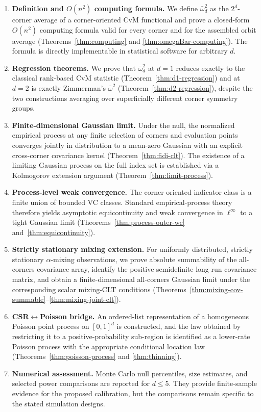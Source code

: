 \documentclass[pdflatex]{sn-jnl}
\theoremstyle{thmstyleone}
\theoremstyle{thmstyletwo}
\theoremstyle{thmstylethree}
\begin{document}
\begin{enumerate}
\item \textbf{Definition and $O(n^2)$ computing formula.} We define $\bar\omega^2_d$ as the $2^d$-corner average of a corner-oriented CvM functional and prove a closed-form $O(n^2)$ computing formula valid for every corner and for the assembled orbit average (Theorems~\ref{thm:computing} and \ref{thm:omegaBar-computing}). The formula is directly implementable in statistical software for arbitrary $d$.
\item \textbf{Regression theorems.} We prove that $\bar\omega^2_d$ at $d=1$ reduces exactly to the classical rank-based CvM statistic (Theorem~\ref{thm:d1-regression}) and at $d=2$ is exactly Zimmerman's $\bar\omega^2$ (Theorem~\ref{thm:d2-regression}), despite the two constructions averaging over superficially different corner symmetry groups.
\item \textbf{Finite-dimensional Gaussian limit.} Under the null, the normalized empirical process at any finite selection of corners and evaluation points converges jointly in distribution to a mean-zero Gaussian with an explicit cross-corner covariance kernel (Theorem~\ref{thm:fidi-clt}). The existence of a limiting Gaussian process on the full index set is established via a Kolmogorov extension argument (Theorem~\ref{thm:limit-process}).
\item \textbf{Process-level weak convergence.} The corner-oriented indicator class is a finite union of bounded VC classes. Standard empirical-process theory therefore yields asymptotic equicontinuity and weak convergence in $\ell^\infty$ to a tight Gaussian limit (Theorems~\ref{thm:process-outer-wc} and~\ref{thm:equicontinuity}).
\item \textbf{Strictly stationary mixing extension.} For uniformly distributed, strictly stationary $\alpha$-mixing observations, we prove absolute summability of the all-corners covariance array, identify the positive semidefinite long-run covariance matrix, and obtain a finite-dimensional all-corners Gaussian limit under the corresponding scalar mixing-CLT conditions (Theorems~\ref{thm:mixing-cov-summable}--\ref{thm:mixing-joint-clt}).
\item \textbf{CSR$\leftrightarrow$Poisson bridge.} An ordered-list representation of a homogeneous Poisson point process on $[0,1]^d$ is constructed, and the law obtained by restricting it to a positive-probability sub-region is identified as a lower-rate Poisson process with the appropriate conditional location law (Theorems~\ref{thm:poisson-process} and \ref{thm:thinning}).
\item \textbf{Numerical assessment.} Monte Carlo null percentiles, size estimates, and selected power comparisons are reported for $d\le5$. They provide finite-sample evidence for the proposed calibration, but the comparisons remain specific to the stated simulation designs.
\end{enumerate}
\end{document}
